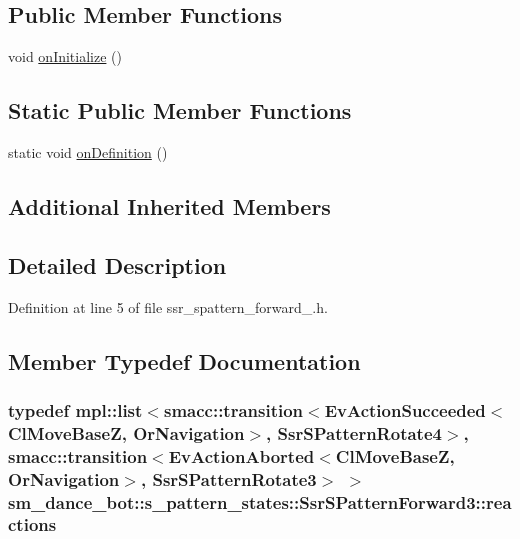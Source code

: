 \subsection*{Public Member Functions}
\begin{DoxyCompactItemize}
\item 
void \hyperlink{structsm__dance__bot_1_1s__pattern__states_1_1SsrSPatternForward3_acbb920519a5ec18ac21a7d5e920c77b6}{on\+Initialize} ()
\end{DoxyCompactItemize}
\subsection*{Static Public Member Functions}
\begin{DoxyCompactItemize}
\item 
static void \hyperlink{structsm__dance__bot_1_1s__pattern__states_1_1SsrSPatternForward3_a9a3f903888fed5a3cd2f4a6f46525343}{on\+Definition} ()
\end{DoxyCompactItemize}
\subsection*{Additional Inherited Members}


\subsection{Detailed Description}


Definition at line 5 of file ssr\+\_\+spattern\+\_\+forward\+\_.\+h.



\subsection{Member Typedef Documentation}
\subsubsection[{\texorpdfstring{reactions}{reactions}}]{\setlength{\rightskip}{0pt plus 5cm}typedef mpl\+::list$<${\bf smacc\+::transition}$<$Ev\+Action\+Succeeded$<${\bf Cl\+Move\+BaseZ}, {\bf Or\+Navigation}$>$, {\bf Ssr\+S\+Pattern\+Rotate4}$>$, {\bf smacc\+::transition}$<$Ev\+Action\+Aborted$<${\bf Cl\+Move\+BaseZ}, {\bf Or\+Navigation}$>$, {\bf Ssr\+S\+Pattern\+Rotate3}$>$ $>$ {\bf sm\+\_\+dance\+\_\+bot\+::s\+\_\+pattern\+\_\+states\+::\+Ssr\+S\+Pattern\+Forward3\+::reactions}}\hypertarget{structsm__dance__bot_1_1s__pattern__states_1_1SsrSPatternForward3_a2848ec67b45a8448e56aa6d2b0817c75}{}\label{structsm__dance__bot_1_1s__pattern__states_1_1SsrSPatternForward3_a2848ec67b45a8448e56aa6d2b0817c75}


